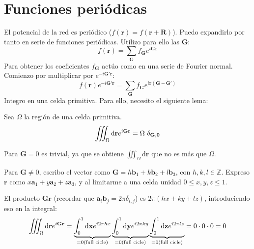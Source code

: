 \section{Funciones periódicas}
\label{sec:fper}
El potencial de la red es periódico
($f(\mathbf{r}) = f (\mathbf{r}+\mathbf{R})$). Puedo expandirlo por
tanto en serie de funciones periódicas. Utilizo para ello las $\mathbf{G}$:
\begin{equation}
  f(\mathbf{r}) = \sum_\mathbf{G} f_\mathbf{G} e ^{i\mathbf{G}\mathbf{r}}
\end{equation}
Para obtener los coeficientes $f _{\mathbf{G}}$ actúo como en una
serie de Fourier normal. Comienzo por multiplicar por $e ^{-i\mathbf{G'}\mathbf{r}}$:
\begin{equation}
  f(\mathbf{r})e ^{-i\mathbf{G'}\mathbf{r}} = \sum_\mathbf{G} f_\mathbf{G} e ^{i\mathbf{r}(\mathbf{G}-\mathbf{G'})}
\label{eq:temporal4565}
\end{equation}
Integro en una celda primitiva. Para ello, necesito el siguiente lema:
\begin{lemma}
  Sea $\Omega$ la región de una celda primitiva.
  \begin{equation}
    \label{eq:lemmaomega}
    \myiiint_\Omega \text{d}\mathbf{r} e ^{i\mathbf{G}\mathbf{r}}=\Omega\  \delta_{\mathbf{G},\mathbf{0}}
  \end{equation}
  \begin{boldproof}
    Para $\mathbf{G} = 0$ es trivial, ya que se obtiene $\iiint_\Omega \text{d}\mathbf{r} $ que no es más que $ \Omega$.

    Para $\mathbf{G}\neq0$, escribo el vector como
    $\mathbf{G} = h \mathbf{b}_1 + k \mathbf{b}_2 + l \mathbf{b}_3$,
    con $h,k,l \in \mathbb{Z}$. Expreso $\mathbf{r}$ como
    $x \mathbf{a}_1 + y \mathbf{a}_2 + z \mathbf{a}_3$, y al limitarme
    a una celda unidad $0 \leq x,y,z \leq 1$. 

    El producto $\mathbf{G}\mathbf{r}$ (recordar que $\mathbf{a}_i\mathbf{b}_j = 2\pi \delta_{i,j}$) es $2\pi(hx+ky+lz)$, introduciendo eso en la integral:
    \begin{equation}
      \myiiint_\Omega \text{d}\mathbf{r} e ^{i\mathbf{G}\mathbf{r}} =
      \underbrace{ \int_0^1 \text{d}\mathbf{x} e ^{i2\pi hx}}_{\mathclap{=0 (\text{full cicle})}}  
       \underbrace{ \int_0^1 \text{d}\mathbf{y} e ^{i2\pi ky}}  _{\mathclap{=0 (\text{full cicle})}}  
  \underbrace{      \int_0^1 \text{d}\mathbf{z} e ^{i2\pi lz}}_{\mathclap{=0 (\text{full cicle})}}   = 0 \cdot 0 \cdot 0 = 0  
    \end{equation}
  \end{boldproof}
\end{lemma}
